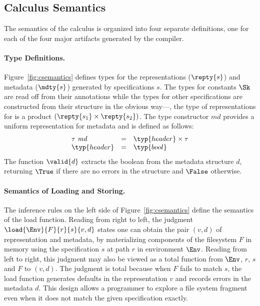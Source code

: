 \subsection{Calculus Semantics}
%
The semantics of the calculus is organized into four separate
definitions, one for each of the four major artifacts generated by the
\forest{} compiler.

\paragraph*{Type Definitions.}
Figure~\ref{fig:csemantics} defines types for the representations
($\repty{s}$) and metadata ($\mdty{s}$) generated by specifications
$s$. The types for constants $\Sk$ are read off from their annotations
while the types for other specifications are constructed from their
structure in the obvious way---\eg, the type of representations for
 is a product $(\repty{s_1} \times
\repty{s_2})$. The type constructor $\mathit{md}$ provides a uniform
representation for metadata and is defined as follows:
\[
\begin{array}{lcl}
\tau~\mathit{md} & = & \typ{header} \times \tau \\
\typ{header} & = & \typ{bool} 
\end{array}
\]
The function $\valid{d}$ extracts the boolean from the metadata
structure $d$, returning $\True$ if there are no errors in the
structure and $\False$ otherwise. 

\paragraph*{Semantics of Loading and Storing.}
The inference rules on the left side of
Figure~\ref{fig:csemantics} define the semantics of the load
function. Reading from right to left, the judgment 
$\load{\Env}{F}{r}{s}{v,d}$ states one can obtain the pair $(v,d)$ of
representation and metadata, by materializing components
of the filesystem $F$ in memory using the specification $s$
at path $r$ in environment $\Env$.  Reading from
left to right, this judgment may also be viewed
as a total function from $\Env$, $r$, $s$ and $F$ to $(v,d)$. The
judgment is total because when $F$ fails to match $s$, the load
function generates defaults in the representation $v$ and records
errors in the metadata $d$.  This design allows a programmer to
explore a file system fragment even when it does not match the
given specification exactly.

